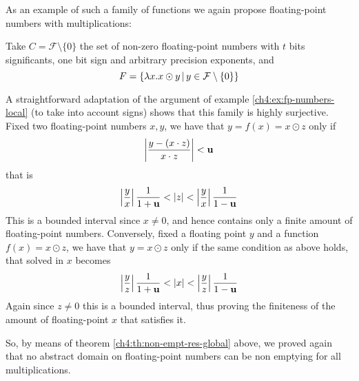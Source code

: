 As an example of such a family of functions we again propose floating-point numbers with multiplications:
\begin{example}
	Take $C = \mathcal{F} \setminus \{ 0 \}$ the set of non-zero floating-point numbers with $t$ bits significants, one bit sign and arbitrary precision exponents, and
	\[
	F = \{ \lambda x . x \odot y \,\vert\, y \in \mathcal{F} \setminus \{ 0 \} \}
	\]

	A straightforward adaptation of the argument of example \ref{ch4:ex:fp-numbers-local} (to take into account signs) shows that this family is highly surjective.
	Fixed two floating-point numbers $x, y$, we have that $y = f(x) = x \odot z$ only if
	\[
	\left\lvert \frac{y - (x \cdot z)}{x \cdot z} \right\rvert < \textbf{u}
	\]
	that is
	\[
	\left\lvert\frac{y}{x}\right\rvert \frac{1}{1+\textbf{u}} < \lvert z\rvert < \left\lvert\frac{y}{x}\right\rvert \frac{1}{1-\textbf{u}}
	\]
	This is a bounded interval since $x \neq 0$, and hence contains only a finite amount of floating-point numbers.
	Conversely, fixed a floating point $y$ and a function $f(x) = x \odot z$, we have that $y = x \odot z$ only if the same condition as above holds, that solved in $x$ becomes
	\[
	\left\lvert\frac{y}{z}\right\rvert \frac{1}{1+\textbf{u}} < \lvert x\rvert < \left\lvert\frac{y}{z}\right\rvert \frac{1}{1-\textbf{u}}
	\]
	Again since $z \neq 0$ this is a bounded interval, thus proving the finiteness of the amount of floating-point $x$ that satisfies it.

	So, by means of theorem \ref{ch4:th:non-empt-res-global} above, we proved again that no abstract domain on floating-point numbers can be non emptying for all multiplications.
\end{example}

